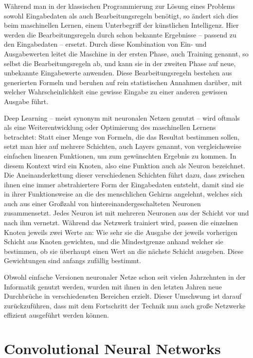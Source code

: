 Während man in der klassischen Programmierung zur Lösung eines Problems sowohl Eingabedaten als auch Bearbeitungsregeln benötigt, so ändert sich dies beim maschinellen Lernen, einem Unterbegriff der künstlichen Intelligenz. Hier werden die Bearbeitungsregeln durch schon bekannte Ergebnisse -- passend zu den Eingabedaten -- ersetzt. Durch diese Kombination von Ein- und Ausgabewerten leitet die Maschine in der ersten Phase, auch Training genannt, so selbst die Bearbeitungsregeln ab, und kann sie in der zweiten Phase auf neue, unbekannte Eingabewerte anwenden. Diese Bearbeitungsregeln bestehen aus generierten Formeln und beruhen auf rein statistischen Annahmen darüber, mit welcher Wahrscheinlichkeit eine gewisse Eingabe zu einer anderen gewissen Ausgabe führt. \cite{deeplearning_18} 

Deep Learning -- meist synonym mit neuronalen Netzen genutzt -- wird oftmals als eine Weiterentwicklung oder Optimierung des maschinellen Lernens betrachtet: Statt einer Menge von Formeln, die das Resultat bestimmen sollen, setzt man hier auf mehrere Schichten, auch Layers genannt, von vergleichsweise einfachen linearen Funktionen, um zum gewünschten Ergebnis zu kommen. In diesem Kontext wird ein Knoten, also eine Funktion auch als Neuron bezeichnet. Die Aneinanderkettung dieser verschiedenen Schichten führt dazu, dass zwischen ihnen eine immer abstrahiertere Form der Eingabedaten entsteht, damit sind sie in ihrer Funktionsweise an die des menschlichen Gehirns angelehnt, welches sich auch aus einer Großzahl von hintereinandergeschalteten Neuronen zusammensetzt. Jedes Neuron ist mit mehreren Neuronen aus der Schicht vor und nach ihm vernetzt. \cite{schmidhuber_15} Während das Netzwerk trainiert wird, passen die einzelnen Knoten jeweils zwei Werte an: Wie sehr sie die Ausgabe der jeweils vorherigen Schicht aus Knoten gewichten, und die Mindestgrenze anhand welcher sie bestimmen, ob sie überhaupt einen Wert an die nächste Schicht ausgeben. Diese Gewichtungen sind anfangs zufällig bestimmt. \cite{hardesty_17, schmidhuber_15}

Obwohl einfache Versionen neuronaler Netze schon seit vielen Jahrzehnten in der Informatik genutzt werden, wurden mit ihnen in den letzten Jahren neue Durchbrüche in verschiedensten Bereichen erzielt. Dieser Umschwung ist darauf zurückzuführen, dass mit dem Fortschritt der Technik nun auch große Netzwerke effizient ausgeführt werden können.




\section{Convolutional Neural Networks}
\label{sec:cnn}

